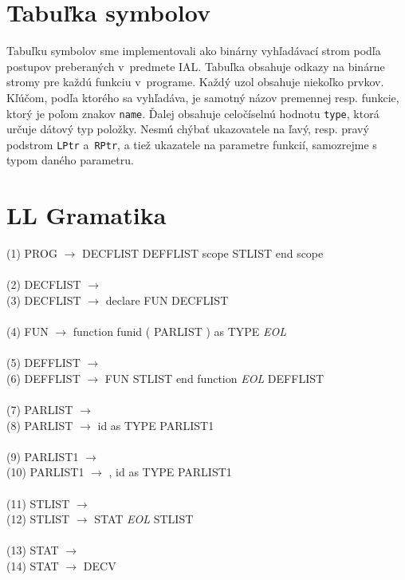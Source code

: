 \documentclass[14pt, a4paper]{extarticle}
\begin{document}
\section{Tabuľka symbolov}
Tabuľku symbolov sme implementovali ako binárny vyhľadávací strom podľa postupov preberaných v~predmete IAL. Tabuľka obsahuje odkazy na binárne stromy pre každú funkciu v~programe. Každý uzol obsahuje niekoľko prvkov. Kľúčom, podľa ktorého sa vyhľadáva, je samotný názov premennej resp. funkcie, ktorý je poľom znakov \texttt{name}. Ďalej obsahuje celočíselnú hodnotu \texttt{type}, ktorá určuje dátový typ položky. Nesmú chýbať ukazovatele na ľavý, resp. pravý podstrom \texttt{LPtr} a~\texttt{RPtr}, a tiež ukazatele na parametre funkcií, samozrejme s typom daného parametru.

\section{LL Gramatika}
\label{gram}
\noindent(1) PROG $\rightarrow$ DECFLIST  DEFFLIST  scope  STLIST  end  scope \\
\\
(2) DECFLIST $\rightarrow$ \textepsilon \\
(3) DECFLIST $\rightarrow$ declare  FUN  DECFLIST \\
\\
(4) FUN $\rightarrow$ function  funid  ( PARLIST )  as  TYPE \textit{EOL} \\
\\
(5) DEFFLIST $\rightarrow$ \textepsilon \\
(6) DEFFLIST $\rightarrow$ FUN  STLIST  end  function \textit{EOL} DEFFLIST \\
\\
(7) PARLIST $\rightarrow$ \textepsilon \\
(8) PARLIST $\rightarrow$ id  as  TYPE  PARLIST1 \\
\\
(9) PARLIST1 $\rightarrow$ \textepsilon \\
(10) PARLIST1 $\rightarrow$ ,  id  as  TYPE  PARLIST1 \\
\\
(11) STLIST $\rightarrow$ \textepsilon \\
(12) STLIST $\rightarrow$ STAT \textit{EOL} STLIST \\
\\
(13) STAT $\rightarrow$ \textepsilon \\
(14) STAT $\rightarrow$ DECV \\
\end{document}
